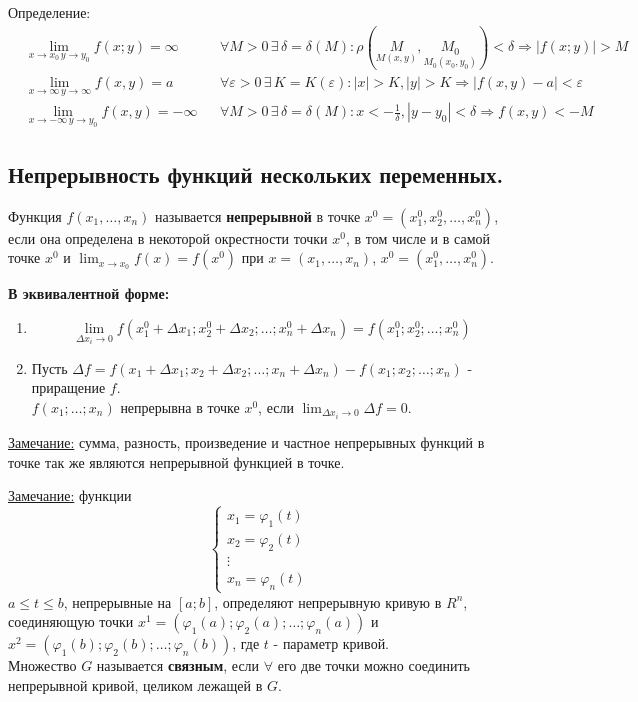 \documentclass[12pt]{article}
\begin{document}
    Определение:
    \begin{align*}
        &\lim_{x \to x_0\, y \to y_0}f(x;y)=\infty & &\forall M > 0\, \exists\, \delta = \delta(M): \rho(\underset{M(x,y)}{M}, \underset{M_0(x_0, y_0)}{M_0}) < \delta \Rightarrow |f(x;y)| > M\\
        &\lim_{x\to\infty\, y\to\infty}f(x,y) = a & &\forall \varepsilon > 0\, \exists\, K = K(\varepsilon): |x| > K, |y| > K \Rightarrow |f(x,y) - a| < \varepsilon\\
        &\lim_{x\to-\infty\, y\to y_0}f(x,y) = -\infty & &\forall M > 0\, \exists\, \delta = \delta(M): x < -\frac{1}{\delta}, |y-y_0|<\delta \Rightarrow f(x,y) < -M
    \end{align*}

    \subsection{Непрерывность функций нескольких переменных.}\noindent
    Функция $f(x_1, \dots, x_n)$ называется \textbf{непрерывной} в точке $x^0 = (x^0_1, x^0_2, \dots, x^0_n)$, если она определена в некоторой окрестности точки $x^0$, в том числе и в самой точке $x^0$ и $\lim_{x \to x_0} f(x) = f(x^0)$ при $x = (x_1, \dots, x_n)$, $x^0 = (x^0_1, \dots, x^0_n)$.\par\noindent
    \textbf{В эквивалентной форме:}
    \begin{enumerate}
        \item \[ \lim_{\Delta x_i \to 0} f(x^0_1 + \Delta x_1; x^0_2 + \Delta x_2; \dots; x^0_n + \Delta x_n) = f(x^0_1; x^0_2; \dots; x^0_n) \]
        \item Пусть $\Delta f = f(x_1 + \Delta x_1; x_2 + \Delta x_2; \dots; x_n + \Delta x_n) - f(x_1; x_2; \dots; x_n)$ - приращение $f$.\\
        $f(x_1; \dots; x_n)$ непрерывна в точке $x^0$, если $\lim_{\Delta x_i \to 0}\Delta f = 0$.
    \end{enumerate}
    \underline{Замечание:} сумма, разность, произведение и частное непрерывных функций в точке так же являются непрерывной функцией в точке.\par\noindent
    \underline{Замечание:} функции
    \[ \begin{cases}
        x_1 = \varphi_1(t)\\
        x_2 = \varphi_2(t)\\
        \vdots\\
        x_n = \varphi_n(t)
    \end{cases} \]
    $a \le t \le b$, непрерывные на $[a;b]$, определяют непрерывную кривую в $R^n$, соединяющую точки $x^1 = (\varphi_1(a); \varphi_2(a); \dots; \varphi_n(a))$ и $x^2 = (\varphi_1(b); \varphi_2(b); \dots; \varphi_n(b))$, где $t$ - параметр кривой.\\
    Множество $G$ называется \textbf{связным}, если $\forall$ его две точки можно соединить непрерывной кривой, целиком лежащей в $G$.
    
\end{document}

